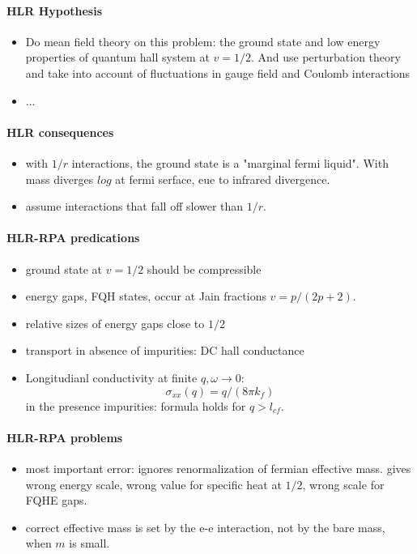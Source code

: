 \documentclass{article}
\numberwithin{equation}{subsection} %
\theoremstyle{definition}
\begin{document}
\paragraph{HLR Hypothesis}
\begin{itemize}
    \item Do mean field theory on this problem: the ground state and low
        energy properties of quantum hall system at $v=1/2$. And use
        perturbation theory and take into account of fluctuations in gauge
        field and Coulomb interactions
    \item ...
\end{itemize}
\paragraph{HLR consequences}
\begin{itemize}
    \item with $1/r$ interactions, the ground state is a "marginal fermi
        liquid". With mass diverges $log$ at fermi serface, eue to
        infrared divergence.
    \item assume interactions that fall off slower than $1/r$.
\end{itemize}
\paragraph{HLR-RPA predications}
\begin{itemize}
    \item ground state at $v=1/2$ should be compressible
    \item energy gaps, FQH states, occur at Jain fractions $v=p/(2p+2)$.
    \item relative sizes of energy gaps close to $1/2$
    \item transport in absence of impurities: DC hall conductance
    \item Longitudianl conductivity at finite $q,\omega\to 0$:
        $$\sigma_{xx}(q)=q/(8\pi k_f) $$
        in the presence impurities: formula holds for $q>l_{cf}$.
\end{itemize}
\paragraph{HLR-RPA problems}
\begin{itemize}
    \item most important error: ignores renormalization of fermian
        effective mass. gives wrong energy scale, wrong value for specific
        heat at $1/2$, wrong scale for FQHE gaps.
    \item correct effective mass is set by the e-e interaction, not by the
        bare mass, when $m$ is small.
\end{itemize}
\end{document}

